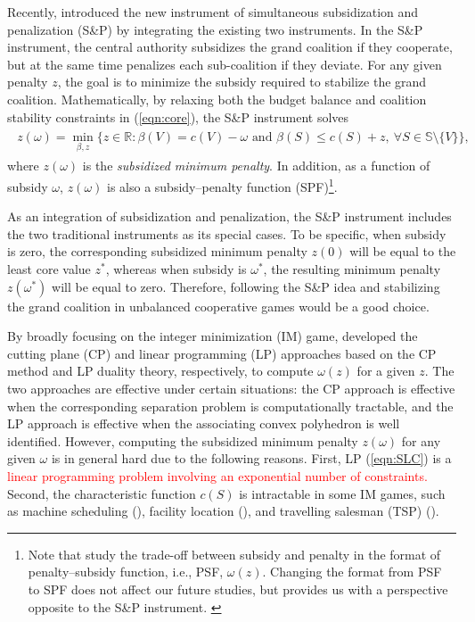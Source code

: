 \documentclass[authoryear,review,12pt]{elsarticle}
\newcommand{\R}{\mathbb{R}}
\begin{document}
Recently, \cite{leastcore2018} introduced the new instrument of simultaneous subsidization and penalization (S\&P) by integrating the existing two instruments.
In the S\&P instrument, the central authority subsidizes the grand coalition if they cooperate, but at the same time penalizes each sub-coalition if they deviate.
For any given penalty $z$, the goal is to minimize the subsidy required to stabilize the grand coalition.
Mathematically, by relaxing both the budget balance and coalition stability constraints in (\ref{eqn:core}), the S\&P instrument solves
\begin{eqnarray}\label{eqn:SLC}
\begin{aligned}
z(\omega) = \min_{\beta,z} \bigg\{ z \in \R:\beta(V)=c(V)-\omega \mbox{ and } \beta(S) \leq c(S)+z,~\forall S \in \mathbb{S} \setminus \{V\} \bigg\},
\end{aligned}
\end{eqnarray}
where $z(\omega)$ is the \textit{subsidized minimum penalty}.
In addition, as a function of subsidy $\omega$, $z(\omega)$ is also a subsidy--penalty function (SPF)\footnote{Note that \cite{leastcore2018} study the trade-off between subsidy and penalty in the format of penalty--subsidy function, i.e., PSF, $\omega(z)$.
Changing the format from PSF to SPF does not affect our future studies, but provides us with a perspective opposite to the S\&P instrument.
 \label{note1}}.


As an integration of subsidization and penalization, the S\&P instrument includes the two traditional instruments as its special cases.
To be specific, when subsidy is zero, the corresponding subsidized minimum penalty $z(0)$ will be equal to the least core value $z^*$, whereas when subsidy is $\omega^*$, the resulting minimum penalty $z(\omega^*)$ will be equal to zero.
Therefore, following the S\&P idea and stabilizing the grand coalition in unbalanced cooperative games would be a good choice.


By broadly focusing on the integer minimization (IM) game, \cite{leastcore2018} developed the cutting plane (CP) and linear programming (LP) approaches based on the CP method and LP duality theory, respectively, to compute $\omega(z)$ for a given $z$.
The two approaches are effective under certain situations: the CP approach is effective when the corresponding separation problem is computationally tractable, and the LP approach is effective when the associating convex polyhedron is well identified.
However, computing the subsidized minimum penalty $z(\omega)$ for any given $\omega$ is in general hard due to the following reasons.
First, LP (\ref{eqn:SLC}) is a \textcolor{red}{linear programming problem involving an exponential number of constraints.}
Second, the characteristic function $c(S)$ is intractable in some IM games, such as machine scheduling (\citealt{leastcore2018}), facility location (\citealt{Kolen1983FL,Goemans2000FL,Puerto2011}), and travelling salesman (TSP) (\citealt{tamir1989core,potters1992traveling,kimms2016core}).
\end{document}
